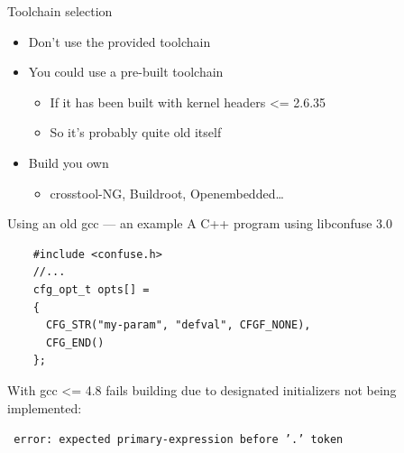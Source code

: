 \documentclass[xetex,table]{beamer}
\begin{document}
\begin{frame}{Toolchain selection}
  \begin{itemize}
  \item Don't use the provided toolchain
  \item You could use a pre-built toolchain
    \begin{itemize}
    \item If it has been built with kernel headers <= 2.6.35
    \item So it's probably quite old itself
    \end{itemize}
  \item Build you own
    \begin{itemize}
    \item crosstool-NG, Buildroot, Openembedded\dots
    \end{itemize}
  \end{itemize}
\end{frame}

\begin{frame}[fragile]{Using an old gcc --- an example}
  A C++ program using libconfuse 3.0

  \begin{verbatim}
    #include <confuse.h>
    //...
    cfg_opt_t opts[] =
    {
      CFG_STR("my-param", "defval", CFGF_NONE),
      CFG_END()
    };
  \end{verbatim}

  With gcc <= 4.8 fails building due to designated initializers not being implemented:

  \texttt{ error: expected primary-expression before '.' token}
\end{frame}
\end{document}
